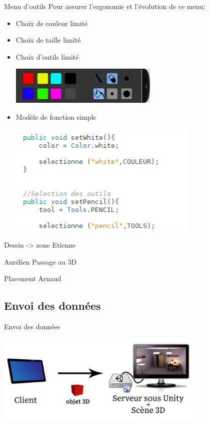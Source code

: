 \documentclass[a4paper,10pt]{beamer}
\begin{document}
	\begin{frame}{Menu d'outils}
		Pour assurer l'ergonomie et l'évolution de ce menu:
			\begin{itemize}
				\item Choix de couleur limité
				\item Choix de taille limité
				\item Choix d'outils limité
					\centerline{\includegraphics[scale=0.4]{images/Nono/img7.png}} 
				\item Modèle de fonction simple
							\centerline{\includegraphics[scale=0.6]{images/Nono/img8.png}} 
			\end{itemize}


	\end{frame}
	
	\begin{frame}
		Dessin -> zone Etienne
	\end{frame}
	
	\begin{frame}
		Aurélien Passage au 3D
	\end{frame}
	
	\begin{frame}
		Placement Arnaud
	\end{frame}
	
	\subsection{Envoi des données}
	
	\begin{frame}{Envoi des données}
		\centerline{\includegraphics[height=120pt]{images/network/sending_model2.png}}
	\end{frame}
	
\end{document}
